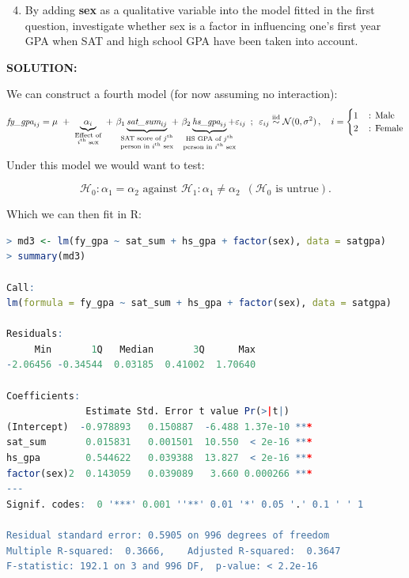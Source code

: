 \documentclass[]{article}
\begin{document}
\begin{enumerate}
\setcounter{enumi}{3}  
\item By adding \textbf{sex} as a qualitative variable into the model fitted in
the first question, investigate whether sex is a factor in influencing one’s first
year GPA when SAT and high school GPA have been taken into account.
\end{enumerate}

\noindent \textbf{SOLUTION:}\newline

\noindent We can construct a fourth model (for now assuming no interaction):
\[
\textit{fy\_gpa}_{ij} = \mu \,\,
+ \,\, \underbrace{\alpha_i}_{\substack{\text{Effect of}\\\text{$i^{\text{th}}$ sex}}}  \,\,
+  \,\, \beta_1 \underbrace{\textit{sat\_sum}_{ij}}_{\smash[b]{\mathclap{\substack{\text{SAT score of } j^{\text{th}} \\ \text{person in } i^{\text{th}} \text{ sex}}}}}
 \,\, + \,\, \beta_2 \underbrace{\textit{hs\_gpa}_{ij}}_{\smash[b]{\mathclap{\substack{\text{HS GPA of } j^{\text{th}} \\ \text{person in } i^{\text{th}} \text{ sex}}}}}
+ \varepsilon_{ij}
\, \,\,;\, \,\,
\varepsilon_{ij}\overset{\text{iid}}{\sim}\mathcal{N}(0,\sigma^2)\,,\quad
i = \begin{cases}
    1\,&:\,\text{Male}\\
    2\,&:\,\text{Female}
\end{cases}
\]

\noindent Under this model we would want to test:

\[
\mathcal{H}_0:\alpha_1=\alpha_2 \text{     against     }\mathcal{H}_1: \alpha_1 \neq \alpha_2 \,\,\,(\mathcal{H}_0\text{ is untrue}).
\]

\noindent Which we can then fit in \textsf{R}:

\begin{lstlisting}[language=R]
> md3 <- lm(fy_gpa ~ sat_sum + hs_gpa + factor(sex), data = satgpa)
> summary(md3)

Call:
lm(formula = fy_gpa ~ sat_sum + hs_gpa + factor(sex), data = satgpa)

Residuals:
     Min       1Q   Median       3Q      Max 
-2.06456 -0.34544  0.03185  0.41002  1.70640 

Coefficients:
              Estimate Std. Error t value Pr(>|t|)    
(Intercept)  -0.978893   0.150887  -6.488 1.37e-10 ***
sat_sum       0.015831   0.001501  10.550  < 2e-16 ***
hs_gpa        0.544622   0.039388  13.827  < 2e-16 ***
factor(sex)2  0.143059   0.039089   3.660 0.000266 ***
---
Signif. codes:  0 '***' 0.001 ''**' 0.01 '*' 0.05 '.' 0.1 ' ' 1

Residual standard error: 0.5905 on 996 degrees of freedom
Multiple R-squared:  0.3666,	Adjusted R-squared:  0.3647 
F-statistic: 192.1 on 3 and 996 DF,  p-value: < 2.2e-16 \end{lstlisting}
\end{document}
